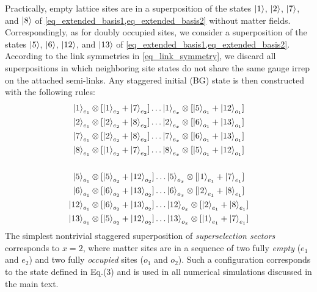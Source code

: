 \documentclass[aps,prl,reprint,twocolumn,superscriptaddress,floatfix,nofootinbib]{revtex4-2}
\begin{document}
Practically, empty lattice sites are in a superposition of the states $\ket{1}$, $\ket{2}$, $\ket{7}$, and $\ket{8}$ of \cref{eq_extended_basis1,eq_extended_basis2} without matter fields.
Correspondingly, as for doubly occupied sites, we consider a superposition of the states $\ket{5}$, $\ket{6}$, $\ket{12}$, and $\ket{13}$ of \cref{eq_extended_basis1,eq_extended_basis2}.
According to the link symmetries in \cref{eq_link_symmetry}, we discard all superpositions in which neighboring site states do not share the same gauge irrep on the attached semi-links.
Any staggered initial (BG) state is then constructed with the following rules:
\begin{equation}
    \label{eq_superposition_rules}
    \begin{split}
        \ket{1}_{e_{1}}  & \otimes[\ket{1}_{e_{2}}+\ket{7}_{e_{2}}]\dots
        \ket{1}_{e_{x}}  \otimes[\ket{5}_{o_{1}}+\ket{12}_{o_{1}}]         \\
        \ket{2}_{e_{1}}  & \otimes[\ket{2}_{e_{2}}+\ket{8}_{e_{2}}]\dots
        \ket{2}_{e_{x}}  \otimes[\ket{6}_{o_{1}}+\ket{13}_{o_{1}}]         \\
        \ket{7}_{e_{1}}  & \otimes[\ket{2}_{e_{2}}+\ket{8}_{e_{2}}]\dots
        \ket{7}_{e_{x}}  \otimes[\ket{6}_{o_{1}}+\ket{13}_{o_{1}}]         \\
        \ket{8}_{e_{1}}  & \otimes[\ket{1}_{e_{2}}+\ket{7}_{e_{2}}]\dots
        \ket{8}_{e_{x}}  \otimes[\ket{5}_{o_{1}}+\ket{12}_{o_{1}}]         \\
        \\
        \ket{5}_{o_{1}}  & \otimes[\ket{5}_{o_{2}}+\ket{12}_{o_{2}}] \dots
        \ket{5}_{o_{x}}  \otimes[\ket{1}_{e_{1}}+\ket{7}_{e_{1}}]          \\
        \ket{6}_{o_{1}}  & \otimes[\ket{6}_{o_{2}}+\ket{13}_{o_{2}}] \dots
        \ket{6}_{o_{x}}  \otimes[\ket{2}_{e_{1}}+\ket{8}_{e_{1}}]          \\
        \ket{12}_{o_{1}} & \otimes[\ket{6}_{o_{2}}+\ket{13}_{o_{2}}] \dots
        \ket{12}_{o_{x}}  \otimes[\ket{2}_{e_{1}}+\ket{8}_{e_{1}}]         \\
        \ket{13}_{o_{1}} & \otimes[\ket{5}_{o_{2}}+\ket{12}_{o_{2}}] \dots
        \ket{13}_{o_{x}}  \otimes[\ket{1}_{e_{1}}+\ket{7}_{e_{1}}]
    \end{split}
\end{equation}
The simplest nontrivial staggered superposition of \emph{superselection sectors}  corresponds to $x=2$, where matter sites are in a sequence of two fully \emph{empty} ($e_{1}$ and $e_{2}$) and two fully \emph{occupied} sites ($o_{1}$ and $o_{2}$).
Such a configuration corresponds to the state defined in Eq.(3) and is used in all numerical simulations discussed in the main text.
\end{document}
